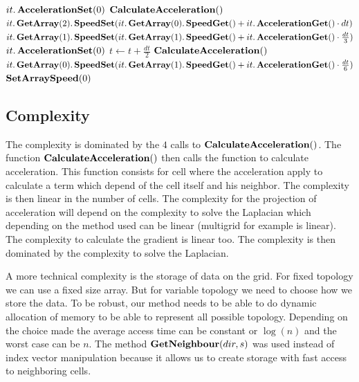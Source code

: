 \begin{algorithm}
\begin{algorithmic}[1]
            \State $it.\mathop{\textbf{AccelerationSet}}(0)$
        \EndFor
        \State $\mathop{\textbf{CalculateAcceleration}}()$
            \State $it.\mathop{\textbf{GetArray}}(2).\mathop{\textbf{SpeedSet}}(it.\mathop{\textbf{GetArray}}(0).\mathop{\textbf{SpeedGet}}()+it.\mathop{\textbf{AccelerationGet}}()\cdot dt)$
            \State $it.\mathop{\textbf{GetArray}}(1).\mathop{\textbf{SpeedSet}}(it.\mathop{\textbf{GetArray}}(1).\mathop{\textbf{SpeedGet}}()+it.\mathop{\textbf{AccelerationGet}}()\cdot \frac{dt}{3})$
        \EndFor
            \State $it.\mathop{\textbf{AccelerationSet}}(0)$
        \EndFor
        \State $t\gets t+\frac{dt}{2}$
        \State $\mathop{\textbf{CalculateAcceleration}}()$
            \State $it.\mathop{\textbf{GetArray}}(0).\mathop{\textbf{SpeedSet}}(it.\mathop{\textbf{GetArray}}(1).\mathop{\textbf{SpeedGet}}()+it.\mathop{\textbf{AccelerationGet}}()\cdot \frac{dt}{6})$
         \EndFor
        \State $\mathop{\textbf{SetArraySpeed}}(0)$
        \EndProcedure
        \end{algorithmic}
\end{algorithm}

\subsection{Complexity}

The complexity is dominated by the $4$ calls to $\mathop{\textbf{CalculateAcceleration}}()$.
The function $\mathop{\textbf{CalculateAcceleration}}()$ then calls the function to calculate acceleration.
This function consists for cell where the acceleration apply to calculate a term which depend of the cell itself and his neighbor.
The complexity is then linear in the number of cells.
The complexity for the projection of acceleration will depend on the complexity to solve the Laplacian which depending
on the method used can be linear (multigrid for example is linear). The complexity to calculate the gradient is linear too.
The complexity is then dominated by the complexity to solve the Laplacian.

A more technical complexity is the storage of data on the grid. For fixed topology we can use a fixed size array.
But for variable topology we need to choose how we store the data.
To be robust, our method needs to be able to do dynamic allocation of memory to be able to represent all possible topology.
Depending on the choice made the average access time can be constant or $\log(n)$ and the worst case can be $n$.
The method $\mathop{\textbf{GetNeighbour}}(dir,s)$ was used instead of index vector manipulation because it allows us to create storage
with fast access to neighboring cells.

